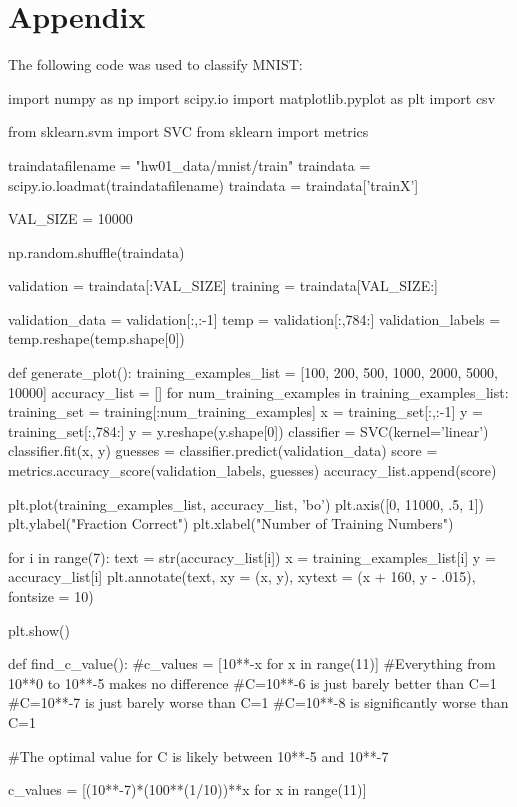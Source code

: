 \documentclass[11pt]{article}
\begin{document}
\section*{Appendix}
The following code was used to classify MNIST:
\begin{python}
import numpy as np
import scipy.io
import matplotlib.pyplot as plt
import csv

from sklearn.svm import SVC
from sklearn import metrics

traindatafilename = "hw01_data/mnist/train"
traindata = scipy.io.loadmat(traindatafilename)
traindata = traindata['trainX']

VAL_SIZE = 10000

np.random.shuffle(traindata)

validation = traindata[:VAL_SIZE]
training = traindata[VAL_SIZE:]

validation_data = validation[:,:-1]
temp = validation[:,784:]
validation_labels = temp.reshape(temp.shape[0])

def generate_plot():
    training_examples_list = [100, 200, 500, 1000, 2000, 5000, 10000]
    accuracy_list = []
    for num_training_examples in training_examples_list:
        training_set = training[:num_training_examples]
        x = training_set[:,:-1]
        y = training_set[:,784:]
        y = y.reshape(y.shape[0])
        classifier = SVC(kernel='linear')
        classifier.fit(x, y)
        guesses = classifier.predict(validation_data)
        score = metrics.accuracy_score(validation_labels, guesses)
        accuracy_list.append(score)

    plt.plot(training_examples_list, accuracy_list, 'bo')
    plt.axis([0, 11000, .5, 1])
    plt.ylabel("Fraction Correct")
    plt.xlabel("Number of Training Numbers")

    for i in range(7):
        text = str(accuracy_list[i])
        x = training_examples_list[i]
        y = accuracy_list[i]
        plt.annotate(text, xy = (x, y), xytext = (x + 160, y - .015), fontsize = 10)

    plt.show()

def find_c_value():
    #c_values = [10**-x for x in range(11)]
    #Everything from 10**0 to 10**-5 makes no difference
    #C=10**-6 is just barely better than C=1
    #C=10**-7 is just barely worse than C=1
    #C=10**-8 is significantly worse than C=1

    #The optimal value for C is likely between 10**-5 and 10**-7

    c_values = [(10**-7)*(100**(1/10))**x for x in range(11)]


\end{python}
\end{document}
